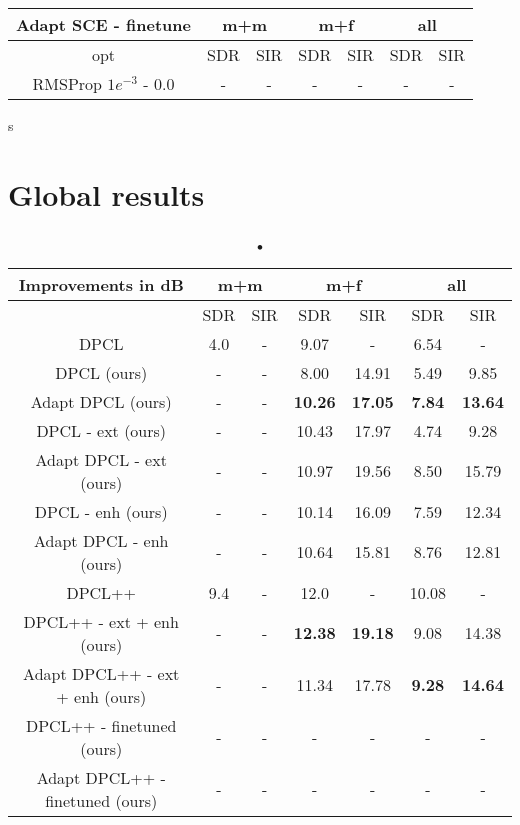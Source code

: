 \documentclass[master,final,11pt]{iscs-thesis}
\begin{document}
\begin{table}[h]
\begin{tabular}{c|c|c|c|c|c|c}
Adapt SCE - finetune & \multicolumn{2}{c|}{m+m} & \multicolumn{2}{c|}{m+f} & \multicolumn{2}{c}{all} \\ 
\hline 
opt & SDR & SIR & SDR & SIR & SDR & SIR \\ 
\hline
RMSProp $1e^{-3}$ - 0.0  & - & - & - & - & - & - \\ 
\end{tabular}s
\caption{}
\end{table}



\section{Global results}




\begin{table}[h]

\begin{tabular}{c|c|c|c|c|c|c}
Improvements in dB & \multicolumn{2}{c|}{m+m} & \multicolumn{2}{c|}{m+f} & \multicolumn{2}{c}{all} \\ 
\hline 
 & SDR & SIR & SDR & SIR & SDR & SIR \\ 
\hline 
DPCL \cite{DPCLV1} & 4.0 & - & 9.07 & - & 6.54 & - \\ 
\hline 
DPCL (ours) & - & - & 8.00 & 14.91 & 5.49 & 9.85 \\ 
\hline 
Adapt DPCL (ours) & - & - & \textbf{10.26} & \textbf{17.05} & \textbf{7.84} & \textbf{13.64} \\ 
\hline 
\hline 
DPCL - ext (ours) & - & - & 10.43 & 17.97 & 4.74 & 9.28 \\ 
\hline 
Adapt DPCL - ext (ours) & - & - & 10.97 & 19.56 & 8.50 & 15.79 \\ 
\hline 
\hline 
DPCL - enh (ours) & - & - & 10.14 & 16.09 & 
7.59 & 12.34 \\ 
\hline 
Adapt DPCL - enh (ours) & - & - & 10.64 & 15.81 & 
8.76 & 12.81 \\ 
\hline
\hline 
DPCL++ \cite{DPCLV2} & 9.4 & - & 12.0 & - & 10.08 & - \\ 
\hline 
DPCL++ - ext + enh (ours) & - & - & \textbf{12.38} & \textbf{19.18} & 9.08 & 14.38 \\ 
\hline 
Adapt DPCL++ - ext + enh (ours) & - & - & 11.34 & 17.78 & \textbf{9.28} & \textbf{14.64} \\ 
\hline 
\hline 
DPCL++ - finetuned (ours) & - & - & - & - & - & - \\ 
Adapt DPCL++ - finetuned (ours) & - & - & - & - & - & - \\ 
\end{tabular}
\caption{•}
\end{table}
\end{document}
